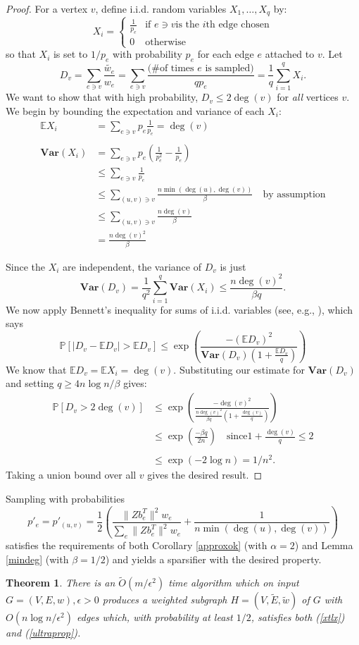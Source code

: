 \documentclass[11pt]{article}
\newtheorem{thm}[lem]{Theorem}
\newcommand{\E}{\mathbb{E}}
\newcommand{\var}{\mathbf{Var}}
\renewcommand{\P}{\mathbb{P}}
\newcommand{\Otilde}{\widetilde{O}}
\begin{document}
\begin{proof} 
For a vertex $v$, define i.i.d. random variables $X_1,\ldots, X_q$ by:
\[
 X_i = \left\{\begin{array}{ll} \frac{1}{p_e} & \textrm{if $e\ni v$
  is the $i$th edge chosen}\\ 0 & \textrm{otherwise}\end{array}\right.
\]
so that $X_{i}$ is set to $1/p_{e}$ with probability $p_{e}$ for each
  edge $e$ attached to $v$.
Let
\[ D_v =  \sum_{e\ni v} \frac{\tilde{w_e}}{w_e} = 
\sum_{e\ni v}\frac{\textrm{(\# of times $e$ is sampled)}}{qp_e} =
\frac{1}{q}\sum_{i=1}^q X_i.\]
We want to show that with high probability, $D_v\le 2\deg(v)$ for {\em all} vertices $v$.
We begin by bounding the expectation and variance of each $X_i$:
\begin{align*}
\E X_i &= \sum_{e\ni v} p_e\frac{1}{p_e}=\deg(v)\\
\\\var (X_i) &= \sum_{e\ni v}p_e\left(\frac{1}{p_e^2}-\frac{1}{p_e}\right)
\\&\le\sum_{e\ni v} \frac{1}{p_e}
\\&\le \sum_{(u,v)\ni v} \frac{n\min(\deg(u),\deg(v))}{\beta}\quad\textrm{by
assumption}
\\&\le \sum_{(u,v)\ni v}\frac{n\deg(v)}{\beta}
\\&= \frac{n\deg(v)^2}{\beta}\end{align*}

Since the $X_i$ are independent, the variance of $D_v$ is just
\[ \var(D_v)=\frac{1}{q^2}\sum_{i=1}^q\var(X_i)\le\frac{n\deg(v)^2}{\beta q}.\]
We now apply Bennett's inequality for sums of i.i.d. variables (see, e.g.,
\cite{lugosi}), which says
\[ \P[|D_v-\E D_v|>\E D_v]\le \exp\left(\frac{-(\E D_v)^2}{\var(D_v)(1+\frac{\E
D_v}{q})}\right)\]
We know that $\E D_v=\E X_i=\deg(v)$. Substituting our estimate for $\var(D_v)$
and setting $q\ge 4n\log n/\beta$ gives:
\begin{align*}
\P[D_v>2\deg(v)] &\le \exp\left(\frac{-\deg(v)^2}{\frac{n\deg(v)^2}{\beta q}(1+\frac{\deg(v)}{q})}\right)
\\&\le \exp\left(\frac{-\beta q}{2n}\right)\quad\textrm{since
$1+\frac{\deg(v)}{q}\le 2$}\\
\\&\le \exp\left(-2\log n\right)=1/n^2.\end{align*}
Taking a union bound over all $v$ gives the desired result.\end{proof}

Sampling with probabilities
\[p'_e=p'_{(u,v)}=\frac{1}{2}\left(\frac{\|Zb_e^T\|^2w_e}{\sum_e
\|Zb_e^T\|^2w_e} + \frac{1}{n\min(\deg(u),\deg(v))}\right)\] satisfies the
requirements of both Corollary \ref{approxok} (with $\alpha=2$) and Lemma \ref{mindeg} (with
$\beta=1/2$) and yields a sparsifier with the desired property.
\begin{thm} There is an $\Otilde(m/\epsilon^2)$ time algorithm which on input
$G=(V,E,w),\epsilon>0$ produces a weighted subgraph $H=(V,\tilde{E},\tilde{w})$
of $G$ with $O(n\log n/\epsilon^2)$ edges which, with probability at least
$1/2$, satisfies both (\ref{xtlx}) and
(\ref{ultraprop}).\end{thm}
\end{document}
